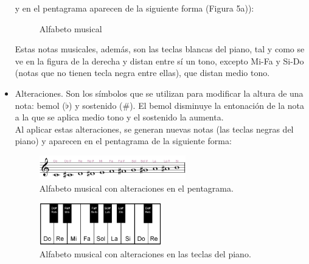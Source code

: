 \documentclass[a4paper, openright, 11pt, titlepage]{report}
\theoremstyle{definition}\newtheorem{defin}[propo]{Definition}
\theoremstyle{definition}\newtheorem{obser}[propo]{Remark}
\theoremstyle{definition}\newtheorem{ejem}[propo]{Ejemplo}
\theoremstyle{definition}\newtheorem{algoritmo}[propo]{Algoritmo}
\begin{document}
\begin{itemize}
    y en el pentagrama aparecen de la siguiente forma (Figura 5a)):
        \begin{figure}[H]
            \centering
                \caption{Alfabeto musical}
                \label{doMayor}
        \end{figure}
    Estas notas musicales, además, son las teclas blancas del piano, tal y como se ve en la figura de la derecha y distan entre sí un tono, excepto Mi-Fa y Si-Do (notas que no tienen tecla negra entre ellas), que distan medio tono.
    \item Alteraciones. Son los símbolos que se utilizan para modificar la altura de una nota: bemol ($\flat$) y sostenido (\#). El bemol disminuye la entonación de la nota a la que se aplica medio tono y el sostenido la aumenta.\\
    Al aplicar estas alteraciones, se generan nuevas notas (las teclas negras del piano) y aparecen en el pentagrama de la siguiente forma:
    \begin{figure}[H]
        \centering
        \includegraphics[width = 0.6\textwidth]{Images/Apéndices/Apéndice A/escalaCromatica.png}
        \caption{Alfabeto musical con alteraciones en el pentagrama.}
    \end{figure}
    \begin{figure}[H]
        \centering
        \includegraphics[width = 0.5\textwidth]{Images/Apéndices/Apéndice A/teclasPiano.png}
        \caption{Alfabeto musical con alteraciones en las teclas del piano.}
    \end{figure}


\end{itemize}
\end{document}
